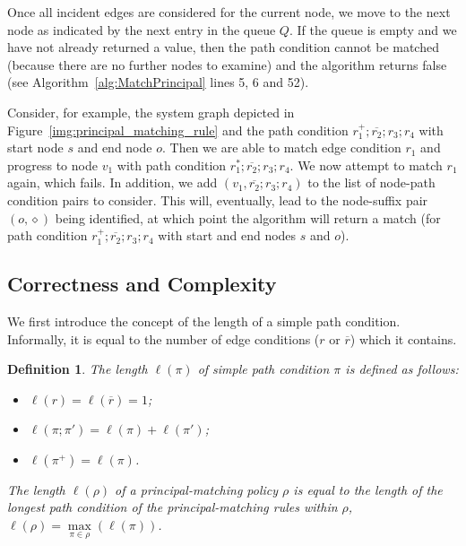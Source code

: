 \documentclass{article}
\newtheorem{definition}{Definition}
\newcommand{\comp}{\mathbin{;}}
\begin{document}
Once all incident edges are considered for the current node, we move to the next node as indicated by the next entry in the queue $Q$. If the queue is empty and we have not already returned a value, then the path condition cannot be matched (because there are no further nodes to examine) and the algorithm returns false (see Algorithm~\ref{alg:MatchPrincipal} lines 5, 6 and 52).

Consider, for example, the system graph depicted in Figure~\ref{img:principal_matching_rule} and the path condition $r_1^+ \comp \overline{r_2} \comp r_3 \comp r_4$ with start node $s$ and end node $o$.
Then we are able to match edge condition $r_1$ and progress to node $v_1$ with path condition $r_1^* \comp \overline {r_2} \comp r_3 \comp r_4$.
We now attempt to match $r_1$ again, which fails.
In addition, we add $(v_1,\overline{r_2} \comp r_3 \comp r_4)$ to the list of node-path condition pairs to consider.
This will, eventually, lead to the node-suffix pair $(o,\diamond)$ being identified, at which point the algorithm will return a match (for path condition $r_1^+ \comp \overline{r_2} \comp r_3 \comp r_4$ with start and end nodes $s$ and $o$).

\subsection{Correctness and Complexity}\label{sec:Algorithm:Complexity}

We first introduce the concept of the length of a simple path condition.
Informally, it is equal to the number of edge conditions ($r$ or $\overline{r}$) which it contains.

\begin{definition}
    The \emph{length} $\ell(\pi)$ of simple path condition $\pi$ is defined as follows:
    \begin{itemize}
        \item  $\ell(r) = \ell(\overline{r}) = 1$;
        \item  $\ell(\pi \comp \pi') = \ell(\pi) + \ell(\pi')$;
        \item  $\ell(\pi^+) = \ell(\pi)$.
    \end{itemize}
    The \emph{length} $\ell(\rho)$ of a principal-matching policy $\rho$ is equal to the length of the longest path condition of the principal-matching rules within $\rho$,
    $\ell(\rho) = \max\limits_{\pi \in \rho} \left(\ell(\pi)\right)$.
\end{definition}
\end{document}
